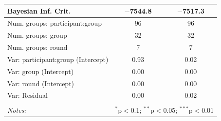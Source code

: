 \begin{table}[!htbp]
{\begin{tabular}{@{\extracolsep{5pt}}lcc}
Bayesian Inf. Crit. & $-$7544.8 & $-$7517.3 \\
\hline
Num. groups: participant:group     & 96     &   96   \\
Num. groups: group               & 32      &    32  \\
Num. groups: round                         & 7   & 7        \\
\hline
Var: participant:group (Intercept) & 0.93   & 0.02     \\
Var: group (Intercept)           & 0.00   & 0.00     \\
Var: round (Intercept)           & 0.00    & 0.00    \\
Var: Residual                    & 0.00     &  0.02  \\
\hline
\hline \\[-1.8ex] 
\textit{Notes:} & \multicolumn{2}{l}{$^{*}$p$<$0.1; $^{**}$p$<$0.05; $^{***}$p$<$0.01} \\ 
\end{tabular} 
}
\end{table} 